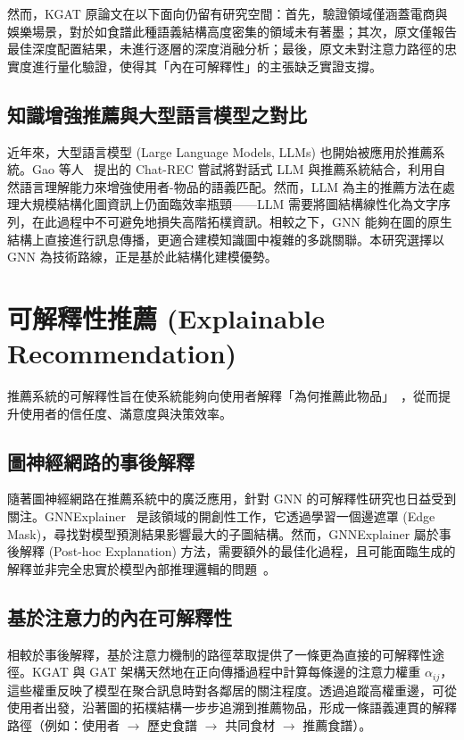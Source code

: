 然而，KGAT 原論文在以下面向仍留有研究空間：首先，驗證領域僅涵蓋電商與娛樂場景，對於如食譜此種語義結構高度密集的領域未有著墨；其次，原文僅報告最佳深度配置結果，未進行逐層的深度消融分析；最後，原文未對注意力路徑的忠實度進行量化驗證，使得其「內在可解釋性」的主張缺乏實證支撐。

\subsection*{知識增強推薦與大型語言模型之對比}

近年來，大型語言模型 (Large Language Models, LLMs) 也開始被應用於推薦系統。Gao 等人~\cite{gao2023chat} 提出的 Chat-REC 嘗試將對話式 LLM 與推薦系統結合，利用自然語言理解能力來增強使用者-物品的語義匹配。然而，LLM 為主的推薦方法在處理大規模結構化圖資訊上仍面臨效率瓶頸——LLM 需要將圖結構線性化為文字序列，在此過程中不可避免地損失高階拓樸資訊。相較之下，GNN 能夠在圖的原生結構上直接進行訊息傳播，更適合建模知識圖中複雜的多跳關聯。本研究選擇以 GNN 為技術路線，正是基於此結構化建模優勢。

\section{可解釋性推薦 (Explainable Recommendation)}

推薦系統的可解釋性旨在使系統能夠向使用者解釋「為何推薦此物品」~\cite{zhang2020explainable}，從而提升使用者的信任度、滿意度與決策效率。

\subsection*{圖神經網路的事後解釋}

隨著圖神經網路在推薦系統中的廣泛應用，針對 GNN 的可解釋性研究也日益受到關注。GNNExplainer~\cite{ying2019gnnexplainer} 是該領域的開創性工作，它透過學習一個邊遮罩 (Edge Mask)，尋找對模型預測結果影響最大的子圖結構。然而，GNNExplainer 屬於事後解釋 (Post-hoc Explanation) 方法，需要額外的最佳化過程，且可能面臨生成的解釋並非完全忠實於模型內部推理邏輯的問題~\cite{yuan2022explainability}。

\subsection*{基於注意力的內在可解釋性}

相較於事後解釋，基於注意力機制的路徑萃取提供了一條更為直接的可解釋性途徑。KGAT 與 GAT 架構天然地在正向傳播過程中計算每條邊的注意力權重 $\alpha_{ij}$，這些權重反映了模型在聚合訊息時對各鄰居的關注程度。透過追蹤高權重邊，可從使用者出發，沿著圖的拓樸結構一步步追溯到推薦物品，形成一條語義連貫的解釋路徑（例如：使用者 $\rightarrow$ 歷史食譜 $\rightarrow$ 共同食材 $\rightarrow$ 推薦食譜）。


